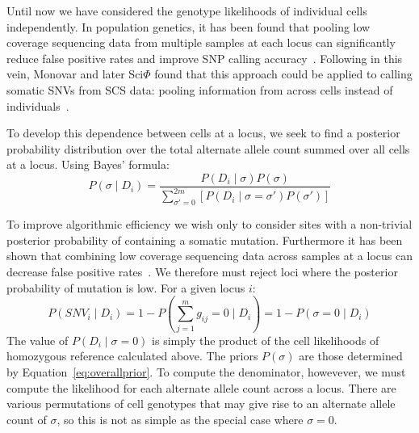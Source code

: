 \documentclass[../../main.tex]{subfiles}
\begin{document}
Until now we have considered the genotype likelihoods of individual cells independently.
In population genetics, it has been found that pooling low coverage sequencing data from multiple samples at each locus can significantly reduce false positive rates and improve SNP calling accuracy~\cite{ledurbin}.
Following in this vein, Monovar and later Sci$\Phi$ found that this approach could be applied to calling somatic SNVs from SCS data: pooling information from across cells instead of individuals~\cite{monovar, sciphi}.

To develop this dependence between cells at a locus, we seek to find a posterior probability distribution over the total alternate allele count summed over all cells at a locus.
Using Bayes' formula:
\begin{equation}\label{eq:sitebayes}
P\left(\sigma \mid D_i\right) = \frac{P(D_i\mid \sigma)P(\sigma)}{\sum_{\sigma'=0}^{2m}[P(D_i\mid \sigma=\sigma')P(\sigma')]}
\end{equation}

To improve algorithmic efficiency we wish only to consider sites with a non-trivial posterior probability of containing a somatic mutation. Furthermore it has been shown that combining low coverage sequencing data across samples at a locus can decrease false positive rates~\cite{ledurbin}. We therefore must reject loci where the posterior probability of mutation is low. For a given locus $i$:
\begin{equation}
P(SNV_i\mid D_i) = 1- P\left(\sum_{j=1}^m g_{ij} = 0 \mid D_i\right) = 1-P(\sigma = 0 \mid D_i)
\end{equation}
The value of $P(D_i\mid \sigma = 0)$ is simply the product of the cell likelihoods of homozygous reference calculated above. The priors $P(\sigma)$ are those determined by Equation~\eqref{eq:overallprior}. To compute the denominator, howevever, we must compute the likelihood for each alternate allele count across a locus. There are various permutations of cell genotypes that may give rise to an alternate allele count of $\sigma$, so this is not as simple as the special case where $\sigma=0$.\\
\end{document}
